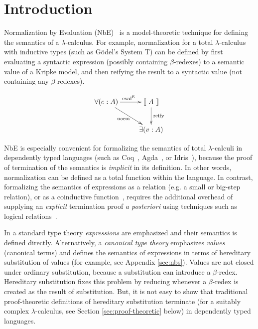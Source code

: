 \documentclass{llncs}
\newcommand{\refapp}[1]{Appendix \ref{sec:#1}}
\newcommand{\refsec}[1]{Section \ref{sec:#1}}
\def\eval{\fun{eval}^\con{E}}
\newcommand{\els}[1]{\llbracket ~ #1 ~ \rrbracket}
\newcommand{\con}[1]{\textmd{#1}}
\newcommand{\fun}[1]{\textmd{#1}}
\begin{document}
\section{Introduction}
\label{sec:intro}

Normalization by Evaluation (NbE)~\cite{TODO} is a model-theoretic
technique for defining the semantics of a $\lambda$-calculus. For
example, normalization for a total $\lambda$-calculus with inductive
types (such as G{\"o}del's System T) can be defined by first
evaluating a syntactic expression (possibly containing $\beta$-redexes) to a
semantic value of a Kripke model, and then reifying the result to a syntactic value
(not containing any $\beta$-redexes).

\begin{displaymath}
    \xymatrix{
          {\forall (e : A)} 
          \ar[dr]_{\fun{norm}}
          \ar[r]^{\eval}
        & {\els{A}}
          \ar[d]^{\large{\fun{reify}}}
\\      & \exists (v : A) }
\end{displaymath}

NbE is especially convenient for formalizing the semantics of total
$\lambda$-calculi in dependently typed languages (such as
Coq~\cite{TODO}, Agda~\cite{TODO}, or Idris~\cite{TODO}), because the
proof of termination of the semantics is \textit{implicit} in its
definition. In other words, normalization can be defined as a total
function within the language.
In contrast, formalizing the semantics of expressions as a
relation (e.g. a small or big-step relation), or as a
coinductive function~\cite{TODO}, requires the additional overhead
of supplying an \textit{explicit}
termination proof \textit{a posteriori} using techniques such as
logical relations~\cite{TODO}.

In a standard type theory \textit{expressions} are emphasized and
their semantics is defined directly. Alternatively, a
\textit{canonical type theory} emphasizes \textit{values} (canonical terms) and defines
the semantics of expressions in terms of hereditary substitution of
values (for example, see \refapp{nbs}). 
Values are not closed under ordinary substitution, because a
substitution can introduce a $\beta$-redex. Hereditary substitution
fixes this problem by reducing whenever a $\beta$-redex is created as
the result of substitution. But, it is not easy to show that
traditional proof-theoretic definitions of hereditary substitution 
terminate (for a suitably complex $\lambda$-calculus, see
\refsec{proof-theoretic} below)
in dependently typed languages.
\end{document}
